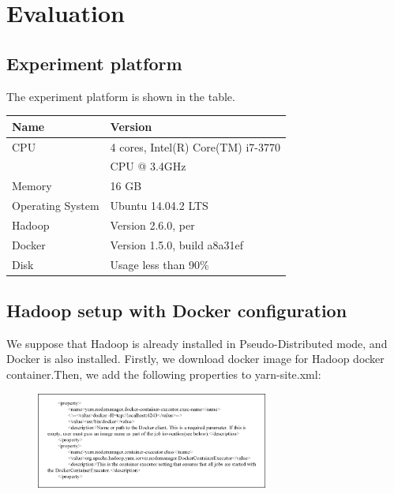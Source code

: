 \section{Evaluation}
\label{sec:eval}

\subsection{Experiment platform}

The experiment platform is shown in the table.

\begin{table}[ht]

\begin{tabular}{|l|l|}
\hline 
Name & Version \\ 
\hline 
CPU & 4 cores, Intel(R) Core(TM) i7-3770 \\
& CPU @ 3.4GHz \\ 
\hline 
Memory & 16 GB \\ 
\hline 
Operating System & Ubuntu 14.04.2 LTS \\ 
\hline 
Hadoop & Version 2.6.0, per \\ 
\hline 
Docker & Version 1.5.0, build a8a31ef \\ 
\hline 
Disk & Usage less than 90\% \\ 
\hline 
\end{tabular}
\end{table}


\subsection{Hadoop setup with Docker configuration}

We suppose that Hadoop is already installed in Pseudo-Distributed mode, and Docker is also installed. Firstly, we download docker image for Hadoop docker container.Then, we add the following properties to yarn-site.xml:

\begin{figure}[h]
  \centering
  \includegraphics[width=3in]{figs/code.eps}
  \label{fig:overview}
\end{figure}


